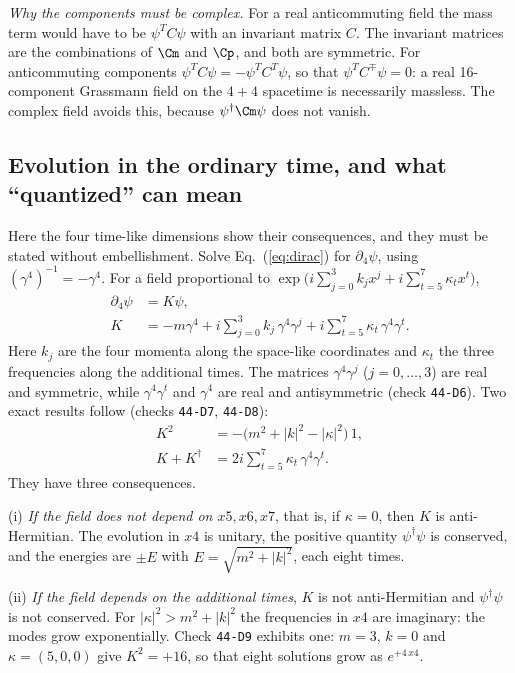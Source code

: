 \emph{Why the components must be complex.} For a real anticommuting field the mass term would have to
be $\psi^TC\psi$ with an invariant matrix $C$. The invariant matrices are the combinations of $\Cm$ and
$\Cp$, and both are symmetric. For anticommuting components
$\psi^TC\psi=-\psi^TC^T\psi$, so that $\psi^TC^{\mp}\psi=0$: a real 16-component Grassmann field on
the $4+4$ spacetime is necessarily massless. The complex field avoids this, because
$\psi^\dagger\Cm\psi$ does not vanish.

\subsection{Evolution in the ordinary time, and what ``quantized'' can mean}
\label{sec:quantized}

Here the four time-like dimensions show their consequences, and they must be stated without
embellishment. Solve Eq.~(\ref{eq:dirac}) for $\partial_4\psi$, using $(\gamma^4)^{-1}=-\gamma^4$. For
a field proportional to $\exp\big(i\sum_{j=0}^3k_jx^j+i\sum_{t=5}^7\kappa_tx^t\big)$,
\begin{align}
\partial_4\psi&=K\psi,\nonumber\\
K&=-m\gamma^4+i\sum_{j=0}^{3}k_j\,\gamma^4\gamma^j+i\sum_{t=5}^{7}\kappa_t\,\gamma^4\gamma^t .
\label{eq:K}
\end{align}
Here $k_j$ are the four momenta along the space-like coordinates and $\kappa_t$ the three frequencies
along the additional times. The matrices $\gamma^4\gamma^j$ ($j=0,\dots,3$) are real and symmetric, while
$\gamma^4\gamma^t$ and $\gamma^4$ are real and antisymmetric (check \texttt{44-D6}). Two exact results
follow (checks \texttt{44-D7}, \texttt{44-D8}):
\begin{align}
K^2&=-\big(m^2+|k|^2-|\kappa|^2\big)\,1,\nonumber\\
K+K^\dagger&=2i\sum_{t=5}^{7}\kappa_t\,\gamma^4\gamma^t .
\label{eq:K2}
\end{align}
They have three consequences.

(i) \emph{If the field does not depend on $x5,x6,x7$}, that is, if $\kappa=0$, then $K$ is
anti-Hermitian. The evolution in $x4$ is unitary, the positive quantity $\psi^\dagger\psi$ is
conserved, and the energies are $\pm E$ with $E=\sqrt{m^2+|k|^2}$, each eight times.

(ii) \emph{If the field depends on the additional times}, $K$ is not anti-Hermitian and
$\psi^\dagger\psi$ is not conserved. For $|\kappa|^2>m^2+|k|^2$ the frequencies in $x4$ are imaginary:
the modes grow exponentially. Check \texttt{44-D9} exhibits one: $m=3$, $k=0$ and $\kappa=(5,0,0)$
give $K^2=+16$, so that eight solutions grow as $e^{+4\,x4}$.

